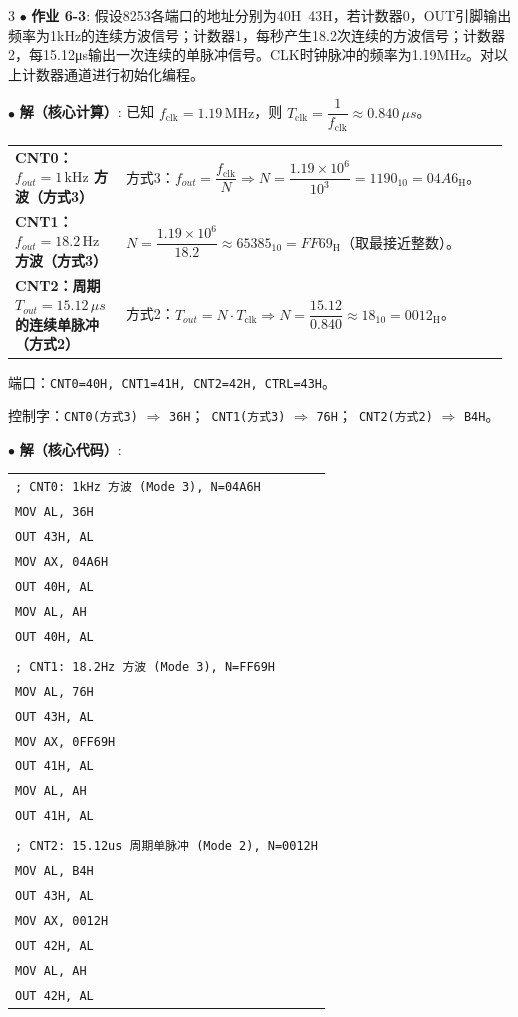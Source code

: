\documentclass[10pt, a4paper, landscape]{article}
\makeatletter
\newcommand{\blue}[1]{\textbf{\textcolor{myblue}{#1}}}
\newcommand{\green}[1]{\textbf{\textcolor{mygreen}{#1}}}
\newcommand{\entry}[2]{$\bullet$ \textbf{#1}: #2\par\vspace{0.5pt}}
\newcommand{\concepttable}[1]{%
    {\setlength{\tabcolsep}{1.5pt}%
     \renewcommand{\arraystretch}{0.92}%
     \par\vspace{2pt}{\color{myblue}\hrule height 0.6pt}\vspace{1pt}%
     \noindent\begin{tabular}{@{}p{0.22\linewidth}p{0.76\linewidth}@{}}%
     #1%
     \end{tabular}%
     \vspace{1pt}{\color{myblue}\hrule height 0.6pt}\par\vspace{2pt}}%
}
\newcommand{\conrow}[2]{\blue{#1} & #2 \\}
\makeatother
\begin{document}
\begin{multicols*}{3}
\entry{\green{作业 6-3}}{假设8253各端口的地址分别为40H~43H，若计数器0，OUT引脚输出频率为1kHz的连续方波信号；计数器1，每秒产生18.2次连续的方波信号；计数器2，每15.12μs输出一次连续的单脉冲信号。CLK时钟脉冲的频率为1.19MHz。对以上计数器通道进行初始化编程。}

\entry{解（核心计算）}{
已知 $f_{\text{clk}}=1.19\,\text{MHz}$，则 $T_{\text{clk}}=\dfrac{1}{f_{\text{clk}}}\approx 0.840\,\mu s$。\par
\concepttable{
    \conrow{CNT0：$f_{out}=1\,\text{kHz}$ 方波（方式3）}{
        方式3：$f_{out}=\dfrac{f_{\text{clk}}}{N}\Rightarrow N=\dfrac{1.19\times10^6}{10^3}=1190_{10}=04A6_{\mathrm{H}}$。
    }
    \conrow{CNT1：$f_{out}=18.2\,\text{Hz}$ 方波（方式3）}{
        $N=\dfrac{1.19\times10^6}{18.2}\approx 65385_{10}=FF69_{\mathrm{H}}$（取最接近整数）。
    }
    \conrow{CNT2：周期 $T_{out}=15.12\,\mu s$ 的连续单脉冲（方式2）}{
        方式2：$T_{out}=N\cdot T_{\text{clk}}\Rightarrow N=\dfrac{15.12}{0.840}\approx 18_{10}=0012_{\mathrm{H}}$。
    }
}
端口：\texttt{CNT0=40H, CNT1=41H, CNT2=42H, CTRL=43H}。\par
控制字：\texttt{CNT0(方式3)} $\Rightarrow$ \texttt{36H}；\ \texttt{CNT1(方式3)} $\Rightarrow$ \texttt{76H}；\ \texttt{CNT2(方式2)} $\Rightarrow$ \texttt{B4H}。
}

\entry{解（核心代码）}{
\begin{tabular}{@{}l@{}}
\texttt{; CNT0: 1kHz 方波 (Mode 3), N=04A6H} \\
\texttt{MOV  AL, 36H} \\
\texttt{OUT  43H, AL} \\
\texttt{MOV  AX, 04A6H} \\
\texttt{OUT  40H, AL} \\
\texttt{MOV  AL, AH} \\
\texttt{OUT  40H, AL} \\
\\
\texttt{; CNT1: 18.2Hz 方波 (Mode 3), N=FF69H} \\
\texttt{MOV  AL, 76H} \\
\texttt{OUT  43H, AL} \\
\texttt{MOV  AX, 0FF69H} \\
\texttt{OUT  41H, AL} \\
\texttt{MOV  AL, AH} \\
\texttt{OUT  41H, AL} \\
\\
\texttt{; CNT2: 15.12us 周期单脉冲 (Mode 2), N=0012H} \\
\texttt{MOV  AL, B4H} \\
\texttt{OUT  43H, AL} \\
\texttt{MOV  AX, 0012H} \\
\texttt{OUT  42H, AL} \\
\texttt{MOV  AL, AH} \\
\texttt{OUT  42H, AL} \\
\end{tabular}
}



\end{multicols*}
\end{document}
